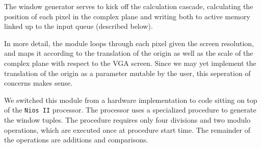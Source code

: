 \documentclass{article}
\begin{document}
The window generator serves to kick off the calculation cascade,
calculating the position of each pixel in the complex plane and
writing both to active memory linked up to the input queue (described
below).

In more detail, the module loops through each pixel given the screen
resolution, and maps it according to the translation of the origin as
well as the scale of the complex plane with respect to the VGA
screen. Since we may yet implement the translation of the origin as a
parameter mutable by the user, this seperation of concerns makes
sense.

We switched this module from a hardware implementation to code sitting
on top of the \verb!Nios II! processor. The processor uses a specialized procedure to generate the window tuples. The procedure requires only four divisions and two modulo operations, which are executed once at procedure start time. The remainder of the operations are additions and comparisons.
\end{document}
